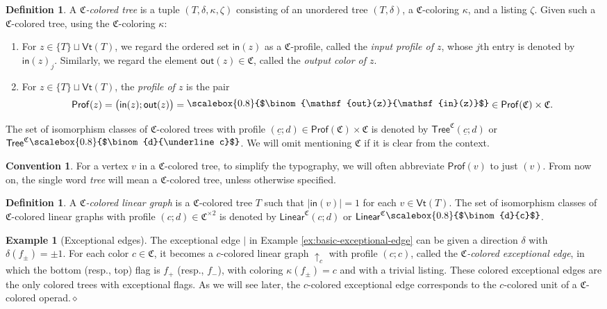 \documentclass[11pt]{amsbook}
\numberwithin{section}{chapter}
\numberwithin{subsection}{section}
\numberwithin{equation}{section}
\theoremstyle{plain}
\theoremstyle{definition}
\newtheorem{definition}[equation]{Definition}
\newtheorem{example}[equation]{Example}
\newtheorem{convention}[equation]{Convention}
\newcommand{\edge}{\vert}
\newcommand{\colorc}{\mathfrak{C}}
\newcommand{\Prof}{\mathsf{Prof}}
\newcommand{\Profc}{\Prof(\colorc)}
\newcommand{\Profcc}{\Profc \times \colorc}
\newcommand{\profofv}{\Prof(v)}
\newcommand{\profofz}{\Prof(z)}
\newcommand{\Vt}{\mathsf{Vt}}
\newcommand{\dqed}{\hfill$\diamond$}
\newcommand{\Linear}{\mathsf{Linear}}
\newcommand{\Linearc}{\Linear^{\colorc}}
\newcommand{\Tree}{\mathsf{Tree}}
\newcommand{\Treec}{\Tree^{\colorc}}
\newcommand{\uc}{\underline c}
\newcommand{\smallprof}[1]
{\raisebox{.05cm}{\scalebox{0.8}{#1}}}
\newcommand{\inout}[1]{\raisebox{.05cm}{\scalebox{0.8}{$\binom{\out(#1)}{\inp(#1)}$}}}
\newcommand{\dc}{\smallprof{$\binom{d}{c}$}}
\newcommand{\duc}{\smallprof{$\binom{d}{\uc}$}}
\newcommand{\inp}{\mathsf{in}}
\newcommand{\out}{\mathsf{out}}
\begin{document}
\begin{definition}\label{def:tree}
A \emph{$\colorc$-colored tree} is a tuple $(T,\delta,\kappa,\zeta)$ consisting of an unordered tree $(T,\delta)$, a $\colorc$-coloring $\kappa$, and a listing $\zeta$.  Given such a $\colorc$-colored tree, using the $\colorc$-coloring $\kappa$:
\begin{enumerate}
\item For $z \in \{T\} \sqcup \Vt(T)$, we regard the ordered set $\inp(z)$ as a $\colorc$-profile, called the \emph{input profile of $z$}, whose $j$th entry is denoted by $\inp(z)_j$.  Similarly, we regard the element $\out(z) \in \colorc$, called the \emph{output color of $z$}.
\item For $z \in \{T\} \sqcup \Vt(T)$, the \emph{profile of $z$} is the pair\label{notation:profz} \[\profofz = \bigl(\inp(z);\out(z)\bigr) = \inout{z} \in \Profcc.\]
\end{enumerate}
The set of isomorphism classes of $\colorc$-colored trees with profile $(\uc;d) \in \Profcc$ is denoted by\label{notation:treecduc} $\Treec(\uc;d)$ or $\Treec\duc$.  We will omit mentioning $\colorc$ if it is clear from the context.
\end{definition}

\begin{convention} For a vertex $v$ in a $\colorc$-colored tree, to simplify the typography, we will often abbreviate $\profofv$ to just $(v)$.  From now on, the single word \emph{tree} will mean a $\colorc$-colored tree, unless otherwise specified.
\end{convention}

\begin{definition}\label{def:linear-graph}
A \emph{$\colorc$-colored linear graph} is a $\colorc$-colored tree $T$ such that $|\inp(v)| = 1$ for each $v \in \Vt(T)$.  The set of isomorphism classes of $\colorc$-colored linear graphs with profile $(c;d) \in \colorc^{\times 2}$ is denoted by $\Linearc(c;d)$ or  $\Linearc\dc$.
\end{definition}

\begin{example}[Exceptional edges]\label{ex:colored-exedge} 
The exceptional edge $\edge$ in Example \ref{ex:basic-exceptional-edge} can be given a direction $\delta$ with $\delta(f_{\pm})=\pm 1$.  For each color $c \in \colorc$, it becomes a $c$-colored linear graph $\uparrow_c$ with profile $(c;c)$, called the \emph{$\colorc$-colored exceptional edge}, in which the bottom (resp., top) flag is $f_+$ (resp., $f_{-}$), with coloring $\kappa(f_{\pm}) = c$ and with a trivial listing.  These colored exceptional edges are the only colored trees with exceptional flags.  As we will see later, the $c$-colored exceptional edge corresponds to the $c$-colored unit of a $\colorc$-colored operad.\dqed
\end{example}
\end{document}
